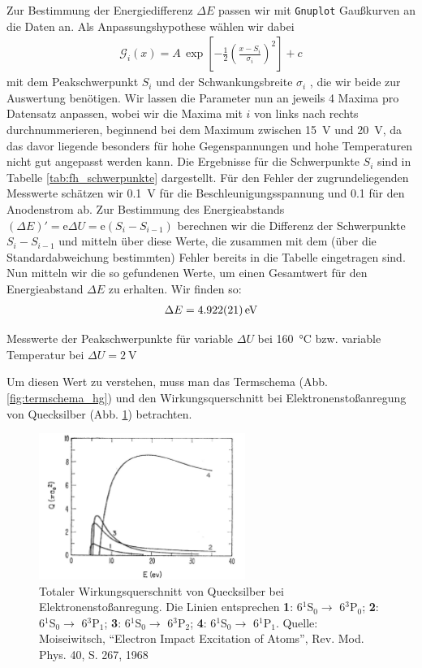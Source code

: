 \documentclass[11pt, a4paper]{article}
\begin{document}
Zur Bestimmung der Energiedifferenz $\Delta E$ passen wir mit \texttt{Gnuplot} Gaußkurven an die Daten an.
Als Anpassungshypothese wählen wir dabei
\begin{align}
\mathcal{G}_i(x)=A\,\exp\left[-\frac{1}{2}\left(\frac{x-S_i}{\sigma_i}\right)^2\right] + c
\label{eq:fh_fithypothese}
\end{align}
mit dem Peakschwerpunkt $S_i$ und der Schwankungsbreite $\sigma_i$ , die wir beide zur Auswertung benötigen.
Wir lassen die Parameter nun an jeweils 4 Maxima pro Datensatz anpassen, wobei wir die Maxima mit $i$ von links nach rechts durchnummerieren, beginnend bei dem Maximum zwischen \SI{15}{\volt} und \SI{20}{\volt}, da das davor liegende besonders für hohe Gegenspannungen und hohe Temperaturen nicht gut angepasst werden kann.
Die Ergebnisse für die Schwerpunkte $S_i$ sind in Tabelle \ref{tab:fh_schwerpunkte} dargestellt.
Für den Fehler der zugrundeliegenden Messwerte schätzen wir \SI{0.1}{\volt} für die Beschleunigungsspannung und \num{0.1} für den Anodenstrom ab.
Zur Bestimmung des Energieabstands $\left(\Delta E\right)'=\text{e}\Delta U=\text{e}(S_i-S_{i-1})$ berechnen wir die Differenz der Schwerpunkte $S_i-S_{i-1}$ und mitteln über diese Werte, die zusammen mit dem (über die Standardabweichung bestimmten) Fehler bereits in die Tabelle eingetragen sind.
Nun mitteln wir die so gefundenen Werte, um einen Gesamtwert für den Energieabstand $\Delta E$ zu erhalten.
Wir finden so:
\begin{align*}
\Delta E = \SI{4.922+-0.021}{\electronvolt}
\end{align*}
\begin{table}[h]
\centering
\resizebox{\columnwidth}{!}{%
}
\caption{Messwerte der Peakschwerpunkte für variable $\Delta U$ bei \SI{160}{\degreeCelsius} bzw. variable Temperatur bei $\Delta U=\SI{2}{\volt}$}
\label{tab:fh_schwerpunkte}
\end{table}
Um diesen Wert zu verstehen, muss man das Termschema (Abb. \ref{fig:termschema_hg}) und den Wirkungsquerschnitt bei Elektronenstoßanregung von Quecksilber (Abb. \ref{fig:wirkungsquerschnitt_hg}) betrachten.
\begin{figure}[h]
\centering
\includegraphics[width=0.6\textwidth]{./figures/wirkungsquerschnitt_hg.pdf}
\caption{Totaler Wirkungsquerschnitt von Quecksilber bei Elektronenstoßanregung. Die Linien entsprechen \textbf{1}: 6$^1$S$_0 \rightarrow$ 6$^3$P$_0$; \textbf{2}: 6$^1$S$_0 \rightarrow$ 6$^3$P$_1$; \textbf{3}: 6$^1$S$_0 \rightarrow$ 6$^3$P$_2$; \textbf{4}: 6$^1$S$_0 \rightarrow$ 6$^1$P$_1$. Quelle: Moiseiwitsch,
"`Electron Impact Excitation of Atoms"', Rev. Mod. Phys. 40, S. 267, 1968}
\label{fig:wirkungsquerschnitt_hg}
\end{figure}
\end{document}
